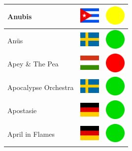 \documentclass[12pt, a4paper, twoside]{report}
\begin{document}
\begin{center}
\begin{longtable}{|p{5cm}|p{2cm}|p{2cm}|}
 Anubis                                                     & \includegraphics[width=1cm]{../4x3/cu} &   \includegraphics[width=1cm]{../likes/m} \\ \hline
 Anüs                                                       & \includegraphics[width=1cm]{../4x3/se} &   \includegraphics[width=1cm]{../likes/y} \\ \hline
 Apey \& The Pea                                            & \includegraphics[width=1cm]{../4x3/hu} &   \includegraphics[width=1cm]{../likes/n} \\ \hline
 Apocalypse Orchestra                                       & \includegraphics[width=1cm]{../4x3/se} &   \includegraphics[width=1cm]{../likes/y} \\ \hline
 Apostasie                                                  & \includegraphics[width=1cm]{../4x3/de} &   \includegraphics[width=1cm]{../likes/y} \\ \hline
 April in Flames                                            & \includegraphics[width=1cm]{../4x3/de} &   \includegraphics[width=1cm]{../likes/y} \\ \hline

\end{longtable}
\end{center}
\end{document}
